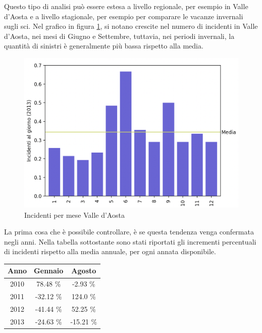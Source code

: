 \documentclass[a4paper,12pt]{report}
\begin{document}
Questo tipo di analisi può essere estesa a livello regionale, 
per esempio in Valle d'Aosta e a livello stagionale, per esempio per 
comparare le vacanze invernali sugli sci. 
Nel grafico in figura \ref{fig:aosta}, si notano crescite nel numero di incidenti 
in Valle d'Aosta, nei mesi di Giugno e Settembre, tuttavia, nei periodi invernali, 
la quantità di sinistri è generalmente più bassa rispetto alla media. 

\begin{figure}
    \includegraphics[width=\linewidth]{../src/incidenti/incidenti_senza_coords/mese_incidenti/aosta_mese.png}
    \caption{Incidenti per mese Valle d'Aosta}
    \label{fig:aosta}
\end{figure}

La prima cosa che è possibile controllare, è se questa tendenza venga confermata negli anni. 
Nella tabella sottostante sono stati riportati gli incrementi percentuali di incidenti 
rispetto alla media annuale, per ogni annata disponibile. 

\begin{center}
    \def\arraystretch{1.5}%
    \begin{tabular}{ |c|c|c| } 
    \hline
    Anno & Gennaio & Agosto \\ 
    \hline
    \rowcolor{TableGray}
    2010 & 78.48 \%  & -2.93 \%\\ 
    2011 & -32.12 \% & 124.0 \%\\
    \rowcolor{TableGray}
    2012 & -41.44 \% & 52.25 \% \\
    2013 & -24.63 \% & -15.21 \% \\
    \hline
    \end{tabular}
\end{center}
\end{document}
